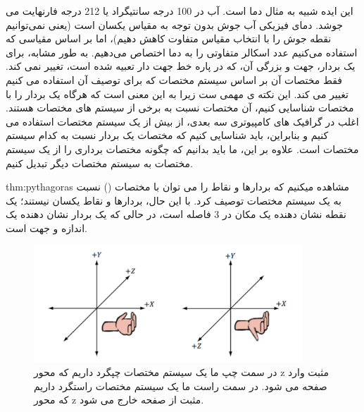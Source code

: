 {\begin{spacing}{1.5}
        این ایده شبیه به مثال دما است. آب در 100 درجه سانتیگراد یا 212 درجه فارنهایت می جوشد.
        دمای فیزیکی آب جوش بدون توجه به مقیاس یکسان است (یعنی نمی‌توانیم نقطه جوش را با انتخاب مقیاس متفاوت کاهش دهیم)،
        اما بر اساس مقیاسی که استفاده می‌کنیم عدد اسکالر متفاوتی را به دما اختصاص می‌دهیم.
        به طور مشابه، برای یک بردار، جهت و بزرگی آن، که در پاره خط جهت دار تعبیه شده است، تغییر نمی کند.
        فقط مختصات آن بر اساس سیستم مختصات که برای توصیف آن استفاده می کنیم تغییر می کند.
        این نکته ی مهمی ست زیرا به این معنی است که هرگاه یک بردار را با مختصات شناسایی کنیم، آن مختصات نسبت به برخی از سیستم های مختصات هستند.
        اغلب در گرافیک های کامپیوتری سه بعدی، از بیش از یک سیستم مختصات استفاده می کنیم و بنابراین، باید شناسایی کنیم که مختصات یک بردار نسبت به کدام سیستم مختصات است.
        علاوه بر این، ما باید بدانیم که چگونه مختصات برداری را از یک سیستم مختصات به سیستم مختصات دیگر تبدیل کنیم.
        \textbf{\vspace{-10pt}}
        \begin{theo}{thm:pythagoras}
            \Large
            مشاهده میکنیم که بردارها و نقاط را می توان با مختصات () نسبت به یک سیستم مختصات توصیف کرد.
            با این حال، بردارها و نقاط یکسان نیستند؛ یک نقطه نشان دهنده یک مکان در 3 فاصله است، در حالی که یک بردار نشان دهنده یک اندازه و جهت است.
        \end{theo}
        \textbf{\vspace{-50pt}}
    \end{spacing}

    \begin{figure}[H]
        \centering
        \setlength{\belowcaptionskip}{-10pt}
        \includegraphics[width=0.9\textwidth]{Images/4/4.Session.1.1.5}
        \caption{در سمت چپ ما یک سیستم مختصات چپگرد داریم که محور z مثبت وارد صفحه می شود. در سمت راست ما یک سیستم مختصات راستگرد داریم که محور z مثبت از صفحه خارج می شود.}
        \label{fig:4.Session.1.1.5}
    \end{figure}
}


